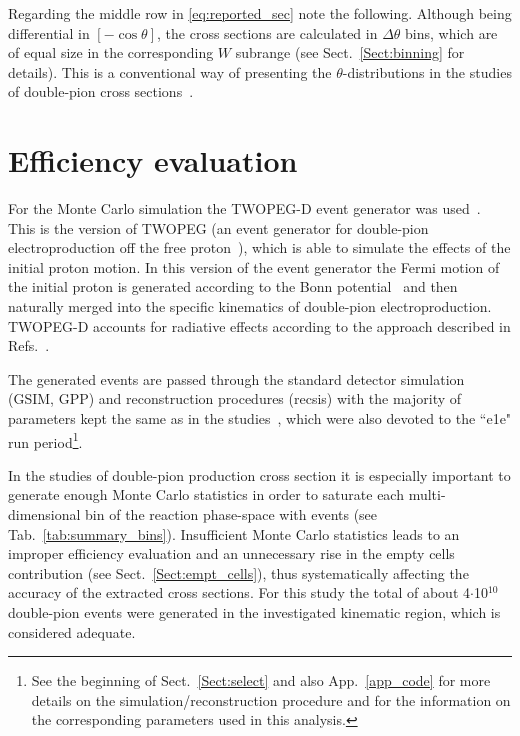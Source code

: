 Regarding the middle row in \eqref{eq:reported_sec} note the following. Although being differential in $[-\cos\theta]$, the cross sections are calculated in $\Delta \theta$ bins, which are of equal size in the corresponding $W$ subrange (see Sect.~\ref{Sect:binning} for details). This is a conventional way of presenting the $\theta$-distributions in the studies of double-pion cross sections~\cite{Rip_an_note:2002,Ripani:2002ss,Fed_an_note:2007,Fedotov:2008aa,Isupov:2017lnd,Arjun,Fed_an_note:2017,Fed_paper_2018}.
\newpage

\section{Efficiency evaluation}
\label{Sect:eff_eval}


For the Monte Carlo simulation the TWOPEG-D event generator was used~\cite{twopeg-d}. This is the version of TWOPEG (an event generator for double-pion electroproduction off the free proton~\cite{twopeg}), which is able to simulate the effects of the initial proton motion. In this version of the event generator the Fermi motion of the initial proton is generated according to the Bonn potential~\cite{Machleidt:1987hj} and then naturally merged into the specific kinematics of double-pion electroproduction. TWOPEG-D accounts for radiative effects according to the approach described in Refs.~\cite{Mo:1968cg,twopeg}.

The generated events are passed through the standard detector simulation (GSIM, GPP) and reconstruction procedures (recsis) with the majority of parameters kept the same as in the studies~\cite{Fed_an_note:2017,Markov:2014}, which were also devoted to the ``e1e" run period\footnote[13]{See the beginning of Sect.~\ref{Sect:select} and also App.~\ref{app_code} for more details on the simulation/reconstruction procedure and for the information on the corresponding parameters used in this analysis.}.




In the studies of double-pion production cross section it is especially important to generate enough Monte Carlo statistics in order to saturate each multi-dimensional bin of the reaction phase-space with events (see Tab.~\ref{tab:summary_bins}). Insufficient Monte Carlo statistics leads to an improper efficiency evaluation and an unnecessary rise in the empty cells contribution (see Sect.~\ref{Sect:empt_cells}), thus systematically affecting the accuracy of the extracted cross sections. For this study the total of about 4$\cdot$10$^{10}$ double-pion events were generated in the investigated kinematic region, which is considered adequate.


